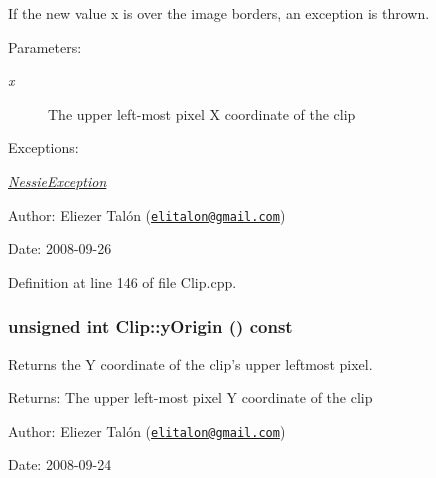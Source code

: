 If the new value x is over the image borders, an exception is thrown.

\begin{Desc}
\item[Parameters:]
\begin{description}
\item[{\em x}]The upper left-most pixel X coordinate of the clip\end{description}
\end{Desc}
\begin{Desc}
\item[Exceptions:]
\begin{description}
\item[{\em \hyperlink{class_nessie_exception}{NessieException}}]\end{description}
\end{Desc}
\begin{Desc}
\item[Author:]Eliezer Talón (\href{mailto:elitalon@gmail.com}{\tt elitalon@gmail.com}) \end{Desc}
\begin{Desc}
\item[Date:]2008-09-26 \end{Desc}


Definition at line 146 of file Clip.cpp.\hypertarget{class_clip_6023296db25d263b311900cafb7cc55d}{
\subsubsection[yOrigin]{\setlength{\rightskip}{0pt plus 5cm}unsigned int Clip::yOrigin () const}}
\label{class_clip_6023296db25d263b311900cafb7cc55d}


Returns the Y coordinate of the clip's upper leftmost pixel. 

\begin{Desc}
\item[Returns:]The upper left-most pixel Y coordinate of the clip\end{Desc}
\begin{Desc}
\item[Author:]Eliezer Talón (\href{mailto:elitalon@gmail.com}{\tt elitalon@gmail.com}) \end{Desc}
\begin{Desc}
\item[Date:]2008-09-24 \end{Desc}


